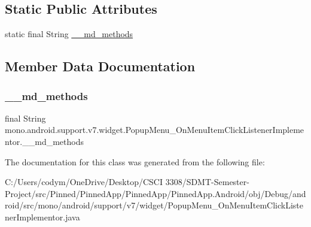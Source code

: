 \subsection*{Static Public Attributes}
\begin{DoxyCompactItemize}
\item 
static final String \hyperlink{classmono_1_1android_1_1support_1_1v7_1_1widget_1_1_popup_menu___on_menu_item_click_listener_implementor_ab113cb5493bf06d8a3e01934bae2ba49}{\+\_\+\+\_\+md\+\_\+methods}
\end{DoxyCompactItemize}


\subsection{Member Data Documentation}
\mbox{\label{classmono_1_1android_1_1support_1_1v7_1_1widget_1_1_popup_menu___on_menu_item_click_listener_implementor_ab113cb5493bf06d8a3e01934bae2ba49}} 
\subsubsection{\texorpdfstring{\+\_\+\+\_\+md\+\_\+methods}{\_\_md\_methods}}
{\footnotesize\ttfamily final String mono.\+android.\+support.\+v7.\+widget.\+Popup\+Menu\+\_\+\+On\+Menu\+Item\+Click\+Listener\+Implementor.\+\_\+\+\_\+md\+\_\+methods\hspace{0.3cm}{\ttfamily [static]}}



The documentation for this class was generated from the following file\+:\begin{DoxyCompactItemize}
\item 
C\+:/\+Users/codym/\+One\+Drive/\+Desktop/\+C\+S\+C\+I 3308/\+S\+D\+M\+T-\/\+Semester-\/\+Project/src/\+Pinned/\+Pinned\+App/\+Pinned\+App/\+Pinned\+App.\+Android/obj/\+Debug/android/src/mono/android/support/v7/widget/Popup\+Menu\+\_\+\+On\+Menu\+Item\+Click\+Listener\+Implementor.\+java\end{DoxyCompactItemize}
